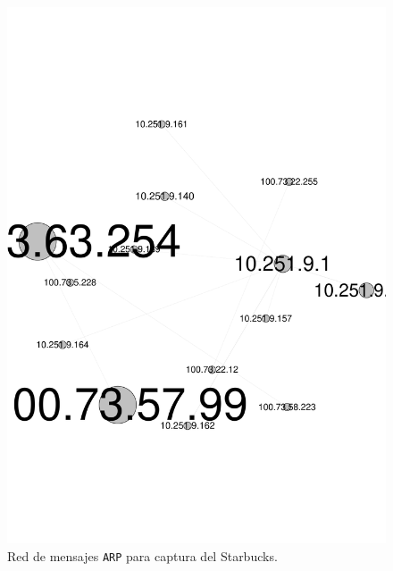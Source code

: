 \begin{figure}[H]
    \includegraphics[scale=0.4]{figures/starbucks.pdf}
    \caption{Red de mensajes \texttt{ARP} para captura del Starbucks.}
\end{figure}

